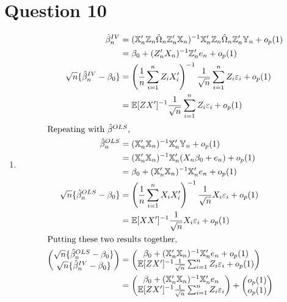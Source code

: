 \documentclass[11pt]{article}
\newcommand{\E}{\mathbb{E}}
\newcommand{\X}{\mathbb{X}}
\newcommand{\Y}{\mathbb{Y}}
\newcommand{\Z}{\mathbb{Z}}
\begin{document}
\section{Question 10}
\label{sec:org9beb378}
  \begin{enumerate}[label=\alph*)]
\item
\begin{align*}
\hat{\beta}_n^{IV} &= (\X'_n \Z_n \hat{\Omega}_n \Z_n' \X_n)^{-1} \X_n' \Z_n\hat{\Omega}_n \Z_n' \Y_n + o_p(1)\\
&= \beta_0 + (Z_n'X_n)^{-1}\Z_n' e_n + o_p(1)\\
\sqrt{n}\{\hat{\beta}^{IV}_n - \beta_0\} &= \left(\frac{1}{n} \sum^n_{i = 1} Z_i X_i'\right)^{-1} \frac{1}{\sqrt{n}} \sum^n_{i = 1} Z_i \varepsilon_i + o_p(1)\\
&= \E[ZX']^{-1} \frac{1}{\sqrt{n}} \sum^n_{i = 1} Z_i \varepsilon_i + o_p(1)\\
\intertext{Repeating with $\hat{\beta}^{OLS}$,}
\hat{\beta}^{OLS}_n &= (\X'_n\X_n)^{-1} \X_n'\Y_n + o_p(1)\\
&= (\X_n'\X_n)^{-1} \X_n' (X_n \beta_0 + e_n) + o_p(1)\\
&= \beta_0 + (\X_n'\X_n)^{-1}\X_n' e_n +o_p(1)\\
\sqrt{n}\{\hat{\beta}^{OLS}_n - \beta_0\} &= \left(\frac{1}{n} \sum^n_{i = 1} X_i X_i'\right)^{-1} \frac{1}{\sqrt{n}} X_i \varepsilon_i + o_p(1)\\
&= \E[XX']^{-1} \frac{1}{\sqrt{n}} X_i \varepsilon_i + o_p(1)\\
\intertext{Putting these two results together,}
\begin{pmatrix} \sqrt{n}\{\hat{\beta}^{OLS}_n - \beta_0\} \\ \sqrt{n}\{\hat{\beta}^{IV}_n - \beta_0\}\end{pmatrix} &= \begin{pmatrix}\beta_0 + (\X_n'\X_n)^{-1}\X_n' e_n +o_p(1) \\ \E[ZX']^{-1} \frac{1}{\sqrt{n}} \sum^n_{i = 1} Z_i \varepsilon_i + o_p(1)\end{pmatrix}\\
&= \begin{pmatrix}\beta_0 + (\X_n'\X_n)^{-1}\X_n' e_n \\ \E[ZX']^{-1} \frac{1}{\sqrt{n}} \sum^n_{i = 1} Z_i \varepsilon_i  \end{pmatrix} + \begin{pmatrix} o_p(1) \\ o_p(1)\end{pmatrix}\\

\end{align*}
\end{enumerate}
\end{document}
